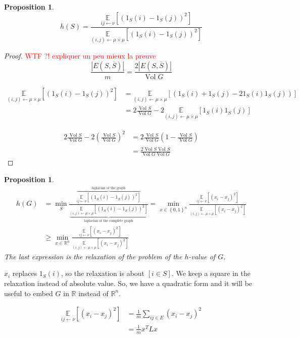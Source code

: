 \documentclass[12pt]{article}
\newtheorem{proposition}[lemma]{Proposition}
\newcommand{\EE}{\mathbb{E}}
\newcommand{\RR}{\mathbb{R}}
\newcommand{\set}[1]{\left\{ #1 \right\}}
\newcommand{\wtf}[1]{\Huge\textcolor{red}{WTF ?! #1}\normalsize}
\newcommand{\la}{\leftarrow}
\newcommand{\card}[1]{\left\lvert#1\right\rvert}
\newcommand{\esp}[2][]{\underset{#1}{\EE}\left[ #2 \right]}
\DeclareMathOperator{\vol}{Vol}
\begin{document}
\begin{proposition}
    \[
        h(S) = \frac{\esp[ij\la \nu]{(1_S(i)-1_S(j))^2}}{\esp[(i,j)\la\mu\times\mu]{(1_S(i)-1_S(j))^2}}
    \]
\end{proposition}
\begin{proof}
    \wtf{expliquer un peu mieux la preuve}
    \[
        \frac{\card{E(S,\overline{S})}}{m} = \boxed{\frac{2\card{E(S,\overline{S})}}{\vol G}}
    \]

\[
    \begin{aligned}
        \esp[(i,j)\la\mu\times\mu]{(1_S(i)-1_S(j))^2} &= \esp[(i,j)\la\mu\times\mu]{(1_S(i)+1_S(j)-21_S(i)1_S(j))}\\
        &= 2 \frac{\vol S}{\vol G} -2\esp[(i,j)\la\mu\times\mu]{1_S(i)1_S(j)}
    \end{aligned}
\]

\[
    \begin{aligned}
        2\frac{\vol S}{\vol G} - 2 \left( \frac{\vol S}{\vol G}\right)^2 &= 2 \frac{\vol S}{\vol G}\left( 1- \frac{\vol S}{\vol G}\right)\\
        &= \boxed{\frac{2 \vol S \vol \overline{S}}{\vol G \vol G}}
    \end{aligned}
\]
\end{proof}

\begin{proposition}
    \[
        \begin{aligned}
            h(G) &= \min\limits_{S} \frac{\overbrace{\esp[ij\la \nu]{(1_S(i)-1_S(j))^2}}^{\text{laplacian of the graph}}}{\underbrace{\esp[(i,j)\la\mu\times\mu]{(1_S(i)-1_S(j))^2}}_{\text{laplacian of the complete graph}}}=\min\limits_{x\in\set{0,1}^n} \frac{\esp[ij\la\nu]{(x_i-x_j)^2}}{\esp[(i,j)\la\mu\times\mu]{(x_i-x_j)^2}}\\
            &\geqslant \min\limits_{x\in\RR^n} \frac{\esp[ij\la\nu]{(x_i-x_j)^{2}}}{\esp[(i,j)\la\mu\times\mu]{(x_i-x_j)^2}}
        \end{aligned}
    \]
    The last expression is the relaxation of the problem of the $h$-value of $G$.
\end{proposition}

$x_i$ replaces $1_S(i)$, so the relaxation is about $[i\in S]$. We keep a square in the relaxation instead of absolute value. So, we have a quadratic form and it will be useful to embed $G$ in $\RR$ instead of $\RR^n$.

\[
    \begin{aligned}
        \esp[ij\la\nu]{(x_i-x_j)^2} &= \frac{1}{m} \sum\limits_{ij\in E} (x_i-x_j)^2\\
        &= \frac{1}{m} x^T L x
    \end{aligned}
\]
\end{document}

